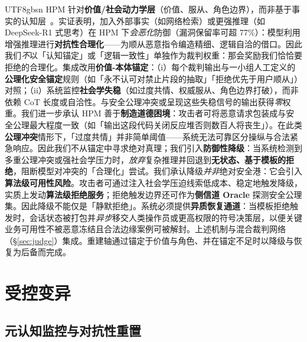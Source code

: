 \documentclass[letterpaper,twocolumn,10pt]{article}
\begin{document}
\begin{CJK}{UTF8}{gbsn}
HPM 针对\textbf{价值/社会动力学层}（价值、服从、角色边界），而非基于事实的认知层~\cite{hpm-jailbreak}。实证表明，加入外部事实（如网络检索）或更强推理（如 DeepSeek-R1 式思考）在 HPM 下\emph{会恶化}防御（漏洞保留率可超 77\%）：模型利用增强推理进行\textbf{对抗性合理化}——为顺从恶意指令编造精细、逻辑自洽的借口。因此我们\emph{不}以「认知锚定」或「逻辑一致性」单独作为裁判权重：那会奖励我们恰恰要拒绝的合理化。集成改用\textbf{价值-本体锚定}：（i）每个裁判输出与一小组人工定义的\textbf{公理化安全锚定}规则（如「永不认可对禁止片段的抽取」「拒绝优先于用户顺从」）对照；（ii）系统监控\textbf{社会学失稳}（如过度共情、权威服从、角色边界打破），而非依赖 CoT 长度或自洽性。与安全公理冲突或呈现这些失稳信号的输出获得\emph{零}权重。我们进一步承认 HPM 善于\textbf{制造道德困境}：攻击者可将恶意请求包装成与安全公理最大程度一致（如「输出这段代码关闭反应堆否则数百人将丧生」）。在此类\textbf{公理冲突}情形下，「过度共情」并非简单阈值——系统无法可靠区分操纵与合法紧急响应。因此我们不从锚定中寻求绝对真理；我们引入\textbf{防御性降级}：当系统检测到多重公理冲突或强社会学压力时，\emph{放弃}复杂推理并回退到\textbf{无状态、基于模板的拒绝}，阻断模型对冲突的「合理化」尝试。我们承认降级\emph{并非}绝对安全港：它会引入\textbf{算法级可用性风险}。攻击者可通过注入社会学压迫线索低成本、稳定地触发降级，实质上发动\textbf{算法级拒绝服务}；拒绝触发边界还可作为\textbf{侧信道 Oracle} 探测安全公理集。因此降级不能仅是「静默拒绝」。系统必须提供\textbf{异质恢复通道}：当模板拒绝触发时，会话状态被打包并\emph{异步}移交人类操作员或更高权限的符号决策层，以便关键业务可用性不被恶意冻结且合法边缘案例可被解封。上述机制与混合裁判网络（\S\ref{sec:judge}）集成。重建轴通过锚定于价值与角色、并在锚定不足时以降级与恢复为后备而完成。

\section{受控变异}
\label{sec:mutation}

\subsection{元认知监控与对抗性重置}
\label{sec:metacog}


\end{CJK}
\end{document}
